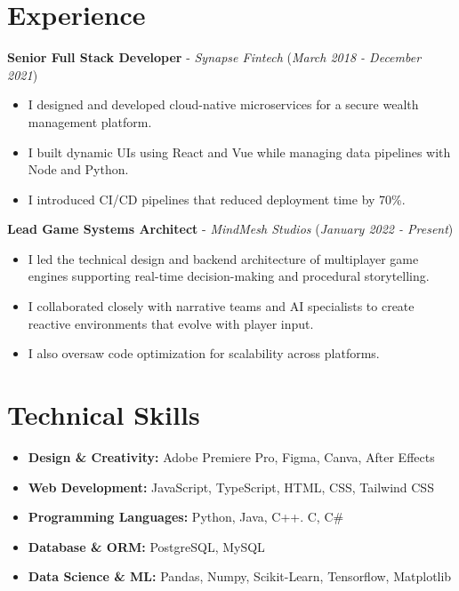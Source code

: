 \documentclass[a4paper,11pt]{article}
\begin{document}
\section{Experience}
\large{\textbf{Senior Full Stack Developer}} - \textit{Synapse Fintech} \hfill (\textit{March 2018 - December 2021}) \\\vspace{-1.5em}
\begin{itemize}[leftmargin=*, itemsep=-0.5em]
    \item I designed and developed cloud-native microservices for a secure wealth management platform.
    \item I built dynamic UIs using React and Vue while managing data pipelines with Node and Python.
    \item I introduced CI/CD pipelines that reduced deployment time by 70\%.
\end{itemize}\vspace{-0.3em}

\large{\textbf{Lead Game Systems Architect}} - \textit{MindMesh Studios} \hfill (\textit{January 2022 - Present}) \\\vspace{-1.5em}
\begin{itemize}[leftmargin=*, itemsep=-0.5em]
    \item I led the technical design and backend architecture of multiplayer game engines supporting real-time decision-making and procedural storytelling.
    \item I collaborated closely with narrative teams and AI specialists to create reactive environments that evolve with player input.
    \item I also oversaw code optimization for scalability across platforms.
\end{itemize}

\section{Technical Skills}
\begin{itemize}[leftmargin=*]
    \setlength\itemsep{-0.5em}
    \item \textbf{Design \& Creativity:} Adobe Premiere Pro, Figma, Canva, After Effects
    \item \textbf{Web Development:} JavaScript, TypeScript, HTML, CSS, Tailwind CSS
    \item \textbf{Programming Languages:} Python, Java, C++. C, C\#
    \item \textbf{Database \& ORM:} PostgreSQL, MySQL
    \item \textbf{Data Science \& ML:} Pandas, Numpy, Scikit-Learn, Tensorflow, Matplotlib
\end{itemize}
\end{document}
